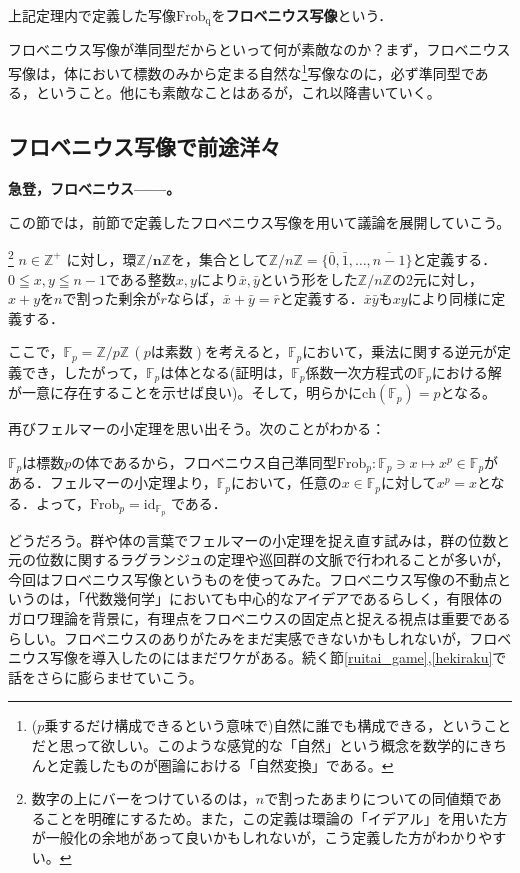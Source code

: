 \begin{dfn}[フロベニウス写像]\label{frob_def}
    上記定理内で定義した写像$\mathrm{Frob_q}$を\textbf{フロベニウス写像}という．
\end{dfn}

フロベニウス写像が準同型だからといって何が素敵なのか？まず，フロベニウス写像は，体において標数のみから定まる自然な\footnote{($p$乗するだけ構成できるという意味で)自然に誰でも構成できる，ということだと思って欲しい。このような感覚的な「自然」という概念を数学的にきちんと定義したものが圏論における「自然変換」である。}写像なのに，必ず準同型である，ということ。他にも素敵なことはあるが，これ以降書いていく。

\subsection{フロベニウス写像で前途洋々}
\textbf{急登，フロベニウス------。}

\vspace{10pt}

この節では，前節で定義したフロベニウス写像を用いて議論を展開していこう。

\begin{dfn}\footnote{数字の上にバーをつけているのは，$n$で割ったあまりについての同値類であることを明確にするため。また，この定義は環論の「イデアル」を用いた方が一般化の余地があって良いかもしれないが，こう定義した方がわかりやすい。}
    $n \in \mathds{Z^{+}}$ に対し，環$\boldsymbol{ \mathds{Z} /n \mathds{Z}}$を，集合として$\mathds{Z} /n \mathds{Z} = \{\bar{0},\bar{1}, \dots ,\overline{n-1} \}$と定義する．$0\leqq x,y \leqq n-1$である整数$x,y$により$\bar{x},\bar{y}$という形をした$\mathds{Z}/n\mathds{Z}$の2元に対し，$x+y$を$n$で割った剰余が$r$ならば，$\bar{x}+\bar{y}=\bar{r}$と定義する．$\bar{x}\bar{y}$も$xy$により同様に定義する．
\end{dfn}

ここで，$\mathds{F}_p=\mathds{Z}/p\mathds{Z} \, (pは素数)$を考えると，$\mathds{F}_p$において，乗法に関する逆元が定義でき，したがって，$\mathds{F}_p$は体となる(証明は，$\mathds{F}_p$係数一次方程式の$\mathds{F}_p$における解が一意に存在することを示せば良い)。そして，明らかに$\mathrm{ch}(\mathds{F}_p)=p$となる。

再びフェルマーの小定理を思い出そう。次のことがわかる：

\begin{mybox}[フロベニウス写像の不動点]
    $\mathds{F}_p$は標数$p$の体であるから，フロベニウス自己準同型$\mathrm{Frob}_p:\mathds{F}_p\ni x\mapsto x^p\in \mathds{F}_p$がある．フェルマーの小定理より，$\mathds{F}_p$において，任意の$x\in \mathds{F}_p$に対して$x^p=x$となる．よって，$\mathrm{Frob}_p=\mathrm{id}_{\mathds{F}_p}$ である．
\end{mybox}
どうだろう。群や体の言葉でフェルマーの小定理を捉え直す試みは，群の位数と元の位数に関するラグランジュの定理や巡回群の文脈で行われることが多いが，今回はフロベニウス写像というものを使ってみた。フロベニウス写像の不動点というのは，「代数幾何学」においても中心的なアイデアであるらしく，有限体のガロワ理論を背景に，有理点をフロベニウスの固定点と捉える視点は重要であるらしい。フロベニウスのありがたみをまだ実感できないかもしれないが，フロベニウス写像を導入したのにはまだワケがある。続く節\ref{ruitai_game},\ref{hekiraku}で話をさらに膨らませていこう。